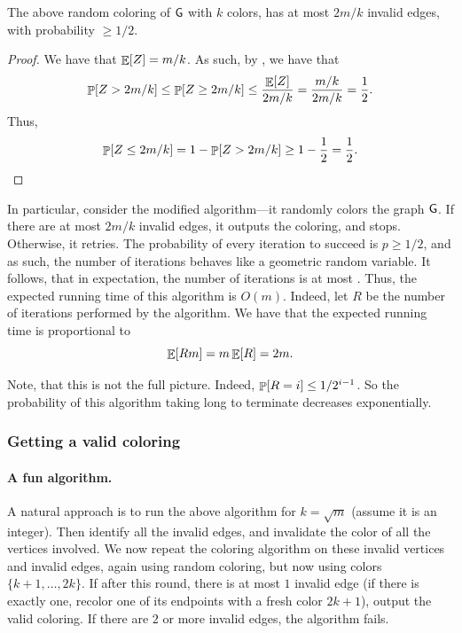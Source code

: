 \begin{lemma}
    The above random coloring of $\mathsf{G}$ with $k$ colors, has at most
    $2m/k$ invalid edges, with probability $\geq 1/2$.
\end{lemma}
\begin{proof}
    We have that $\mathop{\mathbb{E}}\!\left[ {Z} \right] = m/k$. As such, by , we have that
    \begin{equation*}
        \Prob{ Z > 2m/k  }
        \leq 
        \Prob{ Z \geq 2m/k  }
        \leq%
        \frac{\Ex{Z}}{2m/k}
        =
        \frac{m/k}{2m/k}
        =
        \frac{1}{2}.
    \end{equation*}
    Thus,
    \begin{equation*}
        \Prob{Z \leq 2m/k}
        =%
        1- \Prob{Z > 2m/k}
        \geq
        1 - \frac{1}{2}
        =
        \frac{1}{2}.
    \end{equation*}
\end{proof}

In particular, consider the modified algorithm---it randomly colors the
graph $\mathsf{G}$. If there are at most $2m/k$ invalid edges, it outputs the
coloring, and stops. Otherwise, it retries. The probability of every
iteration to succeed is $p \geq 1/2$, and as such, the number of
iterations behaves like a geometric random variable. It follows, that in
expectation, the number of iterations is at most
. Thus, the expected running
time of this algorithm is $O(m)$. Indeed, let $R$ be the number of
iterations performed by the algorithm. We have that the expected running
time is proportional to
\begin{equation*}
    \mathop{\mathbb{E}}\!\left[ {R m } \right] = m\mathop{\mathbb{E}}\!\left[ {R} \right]  = 2m.
\end{equation*}

Note, that this is not the full picture. Indeed,
$\Prob{R = i} \leq 1/2^{i-1}$. So the probability of this algorithm taking
long to terminate decreases exponentially.

\subsubsection{Getting a valid coloring}

\paragraph{A fun algorithm.}
A natural approach is to run the above algorithm for $k=\sqrt{m}$ (assume
it is an integer). Then identify all the invalid edges, and invalidate
the color of all the vertices involved. We now repeat the coloring
algorithm on these invalid vertices and invalid edges, again using random
coloring, but now using colors $\{k+1, \ldots, 2k\}$.  If after this round,
there is at most $1$ invalid edge (if there is exactly one, recolor one
of its endpoints with a fresh color $2k+1$), output the valid
coloring. If there are $2$ or more invalid edges, the algorithm
fails.

